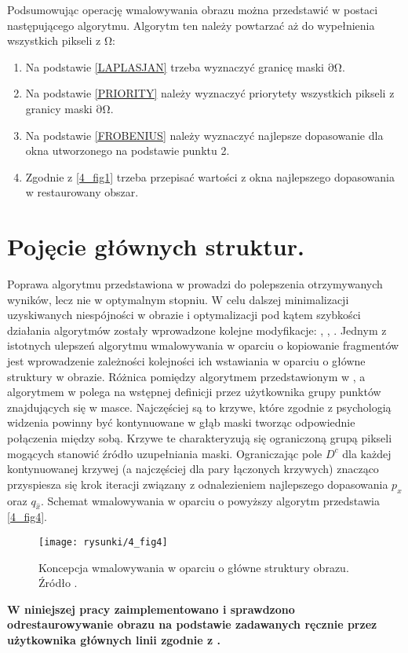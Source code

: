 \documentclass[12pt, twoside, openany]{report}
\theoremstyle{definition}
\begin{document}
Podsumowując operację wmalowywania obrazu można przedstawić w postaci następującego algorytmu. Algorytm ten należy powtarzać aż do wypełnienia wszystkich pikseli z $\mathrm{\Omega }$:
\begin{enumerate}
\item
Na podstawie \eqref{LAPLASJAN} trzeba wyznaczyć granicę maski $\mathrm{\partial }\mathrm{\Omega }$.
\item
Na podstawie \eqref{PRIORITY} należy wyznaczyć priorytety wszystkich pikseli z granicy maski $\mathrm{\partial }\mathrm{\Omega }$.
\item
Na podstawie \eqref{FROBENIUS} należy wyznaczyć najlepsze dopasowanie dla okna utworzonego na podstawie punktu 2.
\item
Zgodnie z \autoref{4_fig1} trzeba przepisać wartości z okna najlepszego dopasowania w restaurowany obszar.
\end{enumerate}
\section{Pojęcie głównych struktur.}
\label{sec:crimMetodSalient}
Poprawa algorytmu przedstawiona w \cite{criminisi2004region} prowadzi do polepszenia otrzymywanych wyników, lecz nie w optymalnym stopniu. W celu dalszej minimalizacji uzyskiwanych niespójności w obrazie i optymalizacji pod kątem szybkości działania algorytmów zostały wprowadzone kolejne modyfikacje: \cite{StructurePropagationManual},  \cite{malluvalasaimplementation}, \cite{SalientStrucTexProp}. 
Jednym z istotnych ulepszeń algorytmu wmalowywania w oparciu o kopiowanie fragmentów jest wprowadzenie zależności kolejności ich wstawiania w oparciu o główne struktury w obrazie.
Różnica pomiędzy algorytmem przedstawionym w \cite{criminisi2004region}, a algorytmem w \cite{StructurePropagationManual} polega na wstępnej definicji przez użytkownika grupy punktów znajdujących się w masce. Najczęściej są to krzywe, które zgodnie z psychologią widzenia powinny być kontynuowane w głąb maski tworząc odpowiednie połączenia między sobą. Krzywe te charakteryzują się ograniczoną grupą pikseli mogących stanowić źródło uzupełniania maski. Ograniczając pole $D^c$ dla każdej kontynuowanej krzywej (a najczęściej dla pary łączonych krzywych) znacząco przyspiesza się krok iteracji związany z odnalezieniem najlepszego dopasowania $p_x$ oraz $q_{\hat{x}}$. Schemat wmalowywania w oparciu o powyższy algorytm przedstawia \autoref{4_fig4}.
\begin{figure}[!h]
	\centering
	\texttt{[image: rysunki/4\_fig4]}
	\caption{Koncepcja wmalowywania w oparciu o główne struktury obrazu. Źródło \cite{StructurePropagationManual}.}
	\label{4_fig4} 
\end{figure}
\textbf{W niniejszej pracy zaimplementowano i sprawdzono odrestaurowywanie obrazu na podstawie zadawanych ręcznie przez użytkownika głównych linii zgodnie z \cite{StructurePropagationManual}.}
\end{document}
